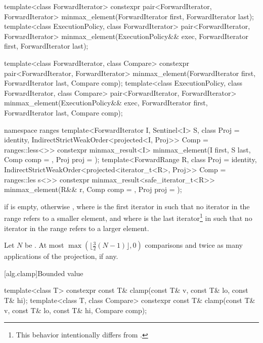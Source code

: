 %
\begin{itemdecl}
template<class ForwardIterator>
  constexpr pair<ForwardIterator, ForwardIterator>
    minmax_element(ForwardIterator first, ForwardIterator last);
template<class ExecutionPolicy, class ForwardIterator>
  pair<ForwardIterator, ForwardIterator>
    minmax_element(ExecutionPolicy&& exec,
                   ForwardIterator first, ForwardIterator last);

template<class ForwardIterator, class Compare>
  constexpr pair<ForwardIterator, ForwardIterator>
    minmax_element(ForwardIterator first, ForwardIterator last, Compare comp);
template<class ExecutionPolicy, class ForwardIterator, class Compare>
  pair<ForwardIterator, ForwardIterator>
    minmax_element(ExecutionPolicy&& exec,
                   ForwardIterator first, ForwardIterator last, Compare comp);

namespace ranges {
  template<ForwardIterator I, Sentinel<I> S, class Proj = identity,
      IndirectStrictWeakOrder<projected<I, Proj>> Comp = ranges::less<>>
    constexpr minmax_result<I>
      minmax_element(I first, S last, Comp comp = {}, Proj proj = {});
  template<ForwardRange R, class Proj = identity,
      IndirectStrictWeakOrder<projected<iterator_t<R>, Proj>> Comp = ranges::les
s<>>
    constexpr minmax_result<safe_iterator_t<R>>
      minmax_element(R&& r, Comp comp = {}, Proj proj = {});
}
\end{itemdecl}


\begin{itemdescr}
\pnum
\returns
{} if  is empty, otherwise
, where  is
the first iterator in  such that no iterator in the range refers
to a smaller element, and where  is the last iterator\footnote{This behavior
intentionally differs from .}
in  such that no iterator in the range refers to a larger element.

\pnum
\complexity
Let $N$ be .
At most
$\max(\bigl\lfloor{\frac{3}{2}} (N-1)\bigr\rfloor, 0)$
comparisons and twice as many applications of the projection, if any.
\end{itemdescr}

[alg.clamp]{Bounded value}

%
\begin{itemdecl}
template<class T>
  constexpr const T& clamp(const T& v, const T& lo, const T& hi);
template<class T, class Compare>
  constexpr const T& clamp(const T& v, const T& lo, const T& hi, Compare comp);
\end{itemdecl}

